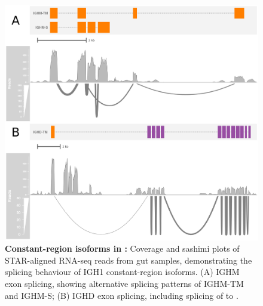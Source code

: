 	\begin{figure}
	\centering
		\begin{subfigure}{0em}
        \label{fig:nfu-locus-sashimi-a}
    \end{subfigure}
    \begin{subfigure}{0em}
        \label{fig:nfu-locus-sashimi-b}
    \end{subfigure}
	\includegraphics[width=\textwidth]{_Figures/png/nfu-locus-sashimi}
	\caption[Constant-region isoforms in \Nfu]{\textbf{Constant-region isoforms in \Nfu:} Coverage and sashimi plots of STAR-aligned RNA-seq reads from \Nfu gut samples, demonstrating the splicing behaviour of IGH1 constant-region isoforms. (A) IGHM exon splicing, showing alternative splicing patterns of IGHM-TM and IGHM-S; (B) IGHD exon splicing, including splicing of  to .}
	\label{fig:nfu-locus-sashimi}
	\end{figure}
	
